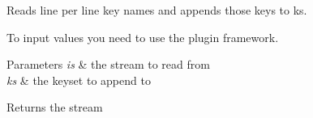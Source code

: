 Reads line per line key names and appends those keys to ks. 

To input values you need to use the plugin framework.


\begin{DoxyParams}{Parameters}
{\em is} & the stream to read from \\
\hline
{\em ks} & the keyset to append to\\
\hline
\end{DoxyParams}
\begin{DoxyReturn}{Returns}
the stream 
\end{DoxyReturn}
